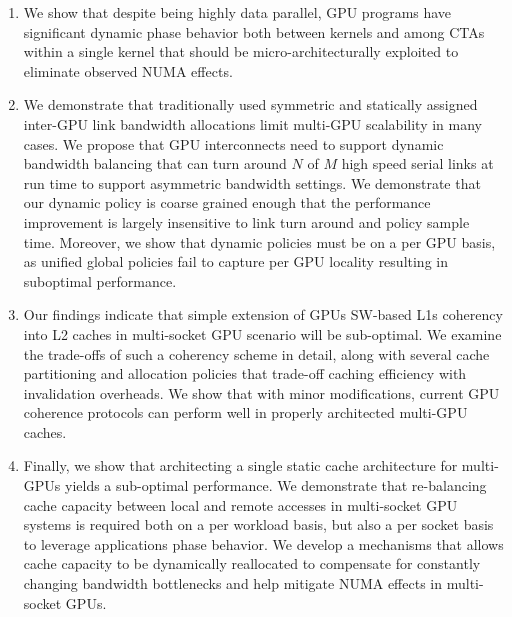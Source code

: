 \begin{enumerate} \item We show that despite being highly data parallel, GPU
programs have significant dynamic phase behavior both between kernels and among
CTAs within a single kernel that should be micro-architecturally exploited to
eliminate observed NUMA effects.

\item We demonstrate that traditionally used symmetric and statically assigned
inter-GPU link bandwidth allocations limit multi-GPU scalability in many cases.
We propose that GPU interconnects need to support dynamic bandwidth balancing
that can turn around $N$ of $M$ high speed serial links at run time to support
asymmetric bandwidth settings. We demonstrate that our dynamic policy is coarse
grained enough that the performance improvement is largely insensitive to link
turn around and policy sample time. Moreover, we show that dynamic policies
must be on a per GPU basis, as unified global policies fail to capture per GPU
locality resulting in suboptimal performance.

\item
Our findings indicate that simple extension of GPUs SW-based L1s coherency into
L2 caches in multi-socket GPU scenario will be sub-optimal.  
We examine the trade-offs of such a coherency scheme in detail, 
along with several cache partitioning and allocation policies that trade-off
caching efficiency with invalidation overheads. We show that with minor modifications, 
current GPU coherence protocols can perform well in properly architected multi-GPU caches.

\item Finally, we show that architecting a single static cache architecture for
multi-GPUs yields a sub-optimal performance. We demonstrate that re-balancing cache
capacity between local and remote accesses in multi-socket GPU systems is
required both on a per workload basis, but also a per socket basis to leverage
applications phase behavior. We develop a mechanisms that allows cache capacity
to be dynamically reallocated to compensate for constantly changing bandwidth
bottlenecks and help mitigate NUMA effects in multi-socket GPUs.






\end{enumerate}
